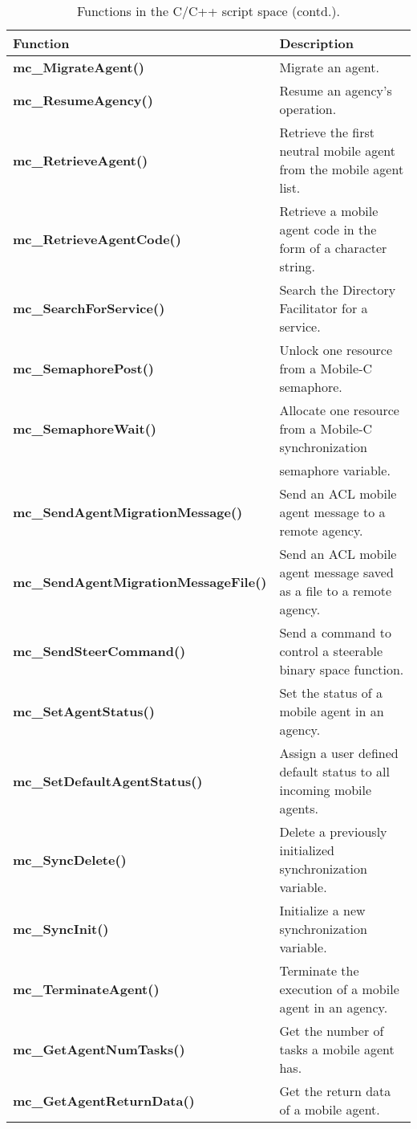 \addtocounter{table}{-1} 
\begin{table}[!h]
\capstart
\begin{center}
\caption{Functions in the C/C++ script space (contd.).}
\begin{tabular}{p{63 mm}p{97 mm}}
\hline
Function & Description \\
\hline
{\bf mc\_MigrateAgent()} & Migrate an agent. \\
{\bf mc\_ResumeAgency()} &  Resume an agency's operation. \\
{\bf mc\_RetrieveAgent()} & Retrieve the first neutral mobile agent from the mobile agent list. \\
{\bf mc\_RetrieveAgentCode()} & Retrieve a mobile agent code in the form of a character string. \\
{\bf mc\_SearchForService()} & Search the Directory Facilitator for a service. \\
{\bf mc\_SemaphorePost()} & Unlock one resource from a Mobile-C semaphore. \\
{\bf mc\_SemaphoreWait()} & Allocate one resource from a Mobile-C synchronization \\
  & semaphore variable. \\
{\bf mc\_SendAgentMigrationMessage()} & Send an ACL mobile agent message to a remote agency. \\
{\bf mc\_SendAgentMigrationMessageFile()} & Send an ACL mobile agent message saved as a file to a remote agency. \\
{\bf mc\_SendSteerCommand()} & Send a command to control a steerable binary space function. \\
{\bf mc\_SetAgentStatus()} & Set the status of a mobile agent in an agency. \\
{\bf mc\_SetDefaultAgentStatus()} & Assign a user defined default status to all incoming mobile agents. \\
{\bf mc\_SyncDelete()} & Delete a previously initialized synchronization variable. \\
{\bf mc\_SyncInit()} & Initialize a new synchronization variable. \\
{\bf mc\_TerminateAgent()} & Terminate the execution of a mobile agent in an agency. \\
{\bf mc\_GetAgentNumTasks()} & Get the number of tasks a mobile agent has. \\
{\bf mc\_GetAgentReturnData()} & Get the return data of a mobile agent. \\

\end{tabular}
\end{center}
\end{table}
